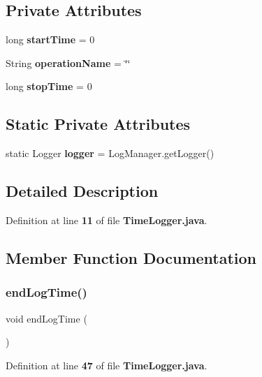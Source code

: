 \subsection*{Private Attributes}
\begin{DoxyCompactItemize}
\item 
long {\bf start\+Time} = 0
\item 
String {\bf operation\+Name} = \char`\"{}\char`\"{}
\item 
long {\bf stop\+Time} = 0
\end{DoxyCompactItemize}
\subsection*{Static Private Attributes}
\begin{DoxyCompactItemize}
\item 
static Logger {\bf logger} = Log\+Manager.\+get\+Logger()
\end{DoxyCompactItemize}


\subsection{Detailed Description}


Definition at line {\bf 11} of file {\bf Time\+Logger.\+java}.



\subsection{Member Function Documentation}
\label{classch_1_1bfh_1_1gr33nopo55um_1_1enocean_1_1helper_1_1TimeLogger_addb6ffcd531617eeac7860e0913cdc05} 
\subsubsection{end\+Log\+Time()}
{\footnotesize\ttfamily void end\+Log\+Time (\begin{DoxyParamCaption}{ }\end{DoxyParamCaption})}



Definition at line {\bf 47} of file {\bf Time\+Logger.\+java}.

